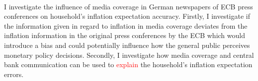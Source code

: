 \documentclass[review]{elsarticle}
\begin{document}
\\
I investigate the influence of media coverage in German newspapers of ECB press conferences on household's inflation expectation accuracy. 
Firstly, I investigate if the information given in regard to inflation in media coverage deviates from the inflation information in the original press conferences by the ECB which would introduce a bias and could potentially influence how the general public perceives monetary policy decisions. Secondly, I investigate how media coverage and central bank communication can be used to \textcolor{red}{explain} the household's inflation expectation errors.
\end{document}
